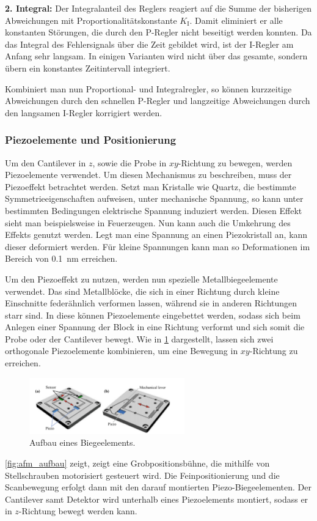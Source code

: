 \textbf{2. Integral:}
Der Integralanteil des Reglers reagiert auf die Summe der bisherigen Abweichungen mit Proportionalitätskonstante
$K_{\mathrm{I}}$.
Damit eliminiert er alle konstanten Störungen, die durch den P-Regler nicht beseitigt werden konnten.
Da das Integral des Fehlersignals über die Zeit gebildet wird, ist der I-Regler am Anfang sehr langsam.
In einigen Varianten wird nicht über das gesamte, sondern übern ein konstantes Zeitintervall integriert.
\autocite[102-104]{afm-buch}

Kombiniert man nun Proportional- und Integralregler, so können kurzzeitige Abweichungen durch den schnellen
P-Regler und langzeitige Abweichungen durch den langsamen I-Regler korrigiert werden.

\subsubsection{Piezoelemente und Positionierung}
Um den Cantilever in $z$, sowie die Probe in $xy$-Richtung zu bewegen, werden Piezoelemente verwendet.
Um diesen Mechanismus zu beschreiben, muss der Piezoeffekt betrachtet werden.
Setzt man Kristalle wie Quartz, die bestimmte Symmetrieeigenschaften aufweisen, unter mechanische Spannung,
so kann unter bestimmten Bedingungen elektrische Spannung induziert werden.
Diesen Effekt sieht man beispielsweise in Feuerzeugen.
Nun kann auch die Umkehrung des Effekts genutzt werden.
Legt man eine Spannung an einen Piezokristall an, kann dieser deformiert werden.
Für kleine Spannungen kann man so Deformationen im Bereich von \qty{0.1}{\nano\meter} erreichen.
\autocite[35-36]{afm-buch}

Um den Piezoeffekt zu nutzen, werden nun spezielle Metallbiegeelemente verwendet.
Das sind Metallblöcke, die sich in einer Richtung durch kleine Einschnitte federähnlich verformen lassen, während
sie in anderen Richtungen starr sind.
In diese können Piezoelemente eingebettet werden, sodass sich beim Anlegen einer Spannung der Block in eine Richtung
verformt und sich somit die Probe oder der Cantilever bewegt.
Wie in \cref{fig:afm_stage} dargestellt, lassen sich zwei orthogonale Piezoelemente kombinieren, um eine Bewegung in
$xy$-Richtung zu erreichen.
\begin{figure}
    \centering
    \includegraphics[width=0.6\textwidth]{../assets/messmethoden/afm/04_stage}
    \caption{Aufbau eines Biegeelements. }
    \label{fig:afm_stage}
\end{figure}
\cref{fig:afm_aufbau} zeigt, zeigt eine Grobpositionsbühne, die
mithilfe von Stellschrauben motorisiert gesteuert wird.
Die Feinpositionierung und die Scanbewegung erfolgt dann mit den darauf montierten Piezo-Biegeelementen.
Der Cantilever samt Detektor wird unterhalb eines Piezoelements montiert, sodass er in $z$-Richtung bewegt werden kann.
\autocite[79-80]{afm-buch}

